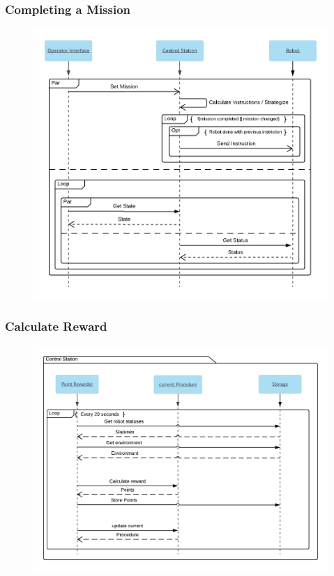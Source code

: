 \subsubsection{Completing a Mission}
\begin{figure}[H]
\includegraphics[width=15cm]{docs/assignments/Final_project/seq_diagram2.png}
\end{figure}
\newpage

\subsubsection{Calculate Reward}
\begin{figure}[H]
\includegraphics[width=15cm]{docs/assignments/Final_project/seq_diagram3.png}
\end{figure}
\newpage

